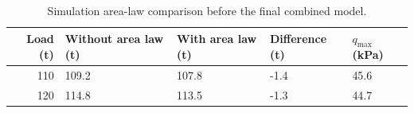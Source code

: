 \begin{table}[htbp]
\caption{Simulation area-law comparison before the final combined model.}
\label{tab:src17}
\small
\setlength{\tabcolsep}{3.5pt}
\begin{tabularx}{\linewidth}{@{}rXXXX@{}}
\toprule
Load (t) & Without area law (t) & With area law (t) & Difference (t) & $q_{\max}$ (kPa) \\
\midrule
110 & 109.2 & 107.8 & -1.4 & 45.6 \\
120 & 114.8 & 113.5 & -1.3 & 44.7 \\
\bottomrule
\end{tabularx}
\par{}
\end{table}
